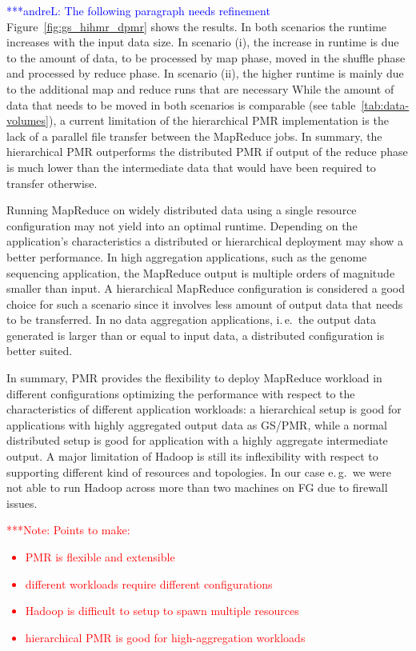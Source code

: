 \documentclass{acm_proc_article-sp}
\newcommand{\alnote}[1]{ {\textcolor{blue} { ***andreL: #1 }}}
\newcommand{\note}[1]{ {\textcolor{red} { ***Note: #1 }}}
\newcommand{\alnote}[1]{}
\newcommand{\note}[1]{}
\begin{document}

\alnote{The following paragraph needs refinement}
Figure~\ref{fig:gs_hihmr_dpmr} shows the results. In both scenarios the runtime
increases with the input data size. In scenario (i), the increase in runtime is
due to the amount of data, to be processed by map phase, moved in the shuffle
phase and processed by reduce phase. In scenario (ii), the higher runtime is
mainly due to the additional map and reduce runs that are necessary While the
amount of data that needs to be moved in both scenarios is comparable (see
table~\ref{tab:data-volumes}), a current limitation of the hierarchical PMR
implementation is the lack of a parallel file transfer between the MapReduce
jobs. In summary, the hierarchical PMR outperforms the distributed PMR if output
of the reduce phase is much lower than the intermediate data that would have
been required to transfer otherwise.



Running MapReduce on widely distributed data using a single resource
configuration may not yield into an optimal runtime. Depending on the
application's characteristics a distributed or hierarchical deployment may show
a better performance. In high aggregation applications, such as the genome 
sequencing application, the MapReduce output is multiple orders of magnitude 
smaller than input. A hierarchical MapReduce configuration is considered a good 
choice for such a scenario since it involves less amount of output data that 
needs to be transferred. In no data aggregation applications, i.\,e.\ the 
output data generated is larger than or equal to input data, a distributed 
configuration is better suited. 


In summary, PMR provides the flexibility to deploy MapReduce workload in
different configurations optimizing the performance with respect to the
characteristics of different application workloads: a hierarchical setup is good
for applications with highly aggregated output data as GS/PMR, while a normal
distributed setup is good for application with a highly aggregate intermediate
output. A major limitation of Hadoop is still its inflexibility with respect to
supporting different kind of resources and topologies. In our case e.\,g.\ we
were not able to run Hadoop across more than two machines on FG due to firewall
issues.


\note{Points to make:
\begin{itemize}
	\item PMR is flexible and extensible
	\item different workloads require different configurations
	\item Hadoop is difficult to setup to spawn multiple resources
	\item hierarchical PMR is good for high-aggregation workloads
\end{itemize}}
\end{document}
